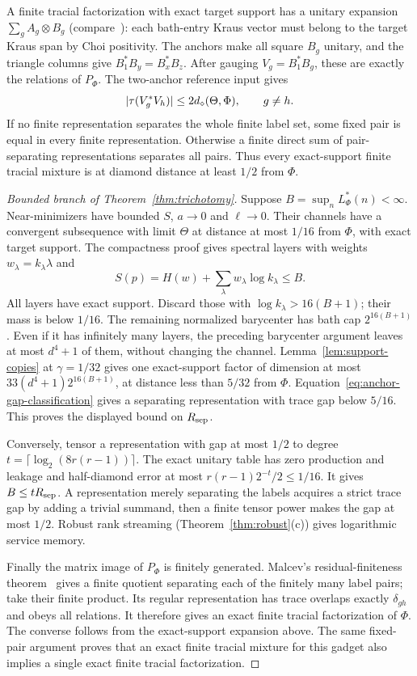 A finite tracial factorization with exact target support has a unitary expansion $\sum_gA_g\otimes B_g$
(compare~\cite[Theorem~2.2]{HaagerupMusat2011}):
each bath-entry Kraus vector must belong to the target Kraus span by Choi positivity.
The anchors make all square $B_g$ unitary, and the triangle columns give $B_1^*B_y=B_x^*B_z$.
After gauging $V_g=B_1^*B_g$, these are exactly the relations of $P_\Phi$.
The two-anchor reference input gives
\begin{equation}\label{eq:anchor-gap-classification}
 |\tau(V_g^*V_h)|\le2d_\diamond(\Theta,\Phi),\qquad g\ne h.
\end{equation}
If no finite representation separates the whole finite label set, some fixed pair is equal in every finite
representation. Otherwise a finite direct sum of pair-separating representations separates all pairs.
Thus every exact-support finite tracial mixture is at diamond distance at least $1/2$ from $\Phi$.

\begin{proof}[Bounded branch of Theorem~\ref{thm:trichotomy}]
Suppose $B=\sup_nL^*_\Phi(n)<\infty$. Near-minimizers have bounded $S$, $a\to0$ and $\ell\to0$.
Their channels have a convergent subsequence with limit $\Theta$ at distance at most $1/16$ from $\Phi$,
with exact target support. The compactness proof gives spectral layers with weights
$w_\lambda=k_\lambda\lambda$ and
\[
 S(p)=H(w)+\sum_\lambda w_\lambda\log k_\lambda\le B.
\]
All layers have exact support. Discard those with $\log k_\lambda>16(B+1)$; their mass is below $1/16$.
The remaining normalized barycenter has bath cap $2^{16(B+1)}$. Even if it has infinitely many layers,
the preceding barycenter argument leaves at most $d^4+1$ of them, without changing the channel.
Lemma~\ref{lem:support-copies} at $\gamma=1/32$ gives one exact-support factor of dimension
at most $33(d^4+1)2^{16(B+1)}$, at distance less than $5/32$ from $\Phi$.
Equation~\eqref{eq:anchor-gap-classification} gives a separating representation with trace gap below $5/16$.
This proves the displayed bound on $R_{\rm sep}$.

Conversely, tensor a representation with gap at most $1/2$ to degree
$t=\lceil\log_2(8r(r-1))\rceil$. The exact unitary table has zero production and leakage and
half-diamond error at most $r(r-1)2^{-t}/2\le1/16$.
It gives $B\le tR_{\rm sep}$. A representation merely separating the labels acquires a strict trace gap by
adding a trivial summand, then a finite tensor power makes the gap at most $1/2$.
Robust rank streaming (Theorem~\ref{thm:robust}(c)) gives logarithmic service memory.

Finally the matrix image of $P_\Phi$ is finitely generated. Malcev's residual-finiteness theorem~\cite{Nica2013}
gives a finite quotient separating each of the finitely many label pairs; take their finite product.
Its regular representation has trace overlaps exactly $\delta_{gh}$ and obeys all relations.
It therefore gives an exact finite tracial factorization of $\Phi$.
The converse follows from the exact-support expansion above. The same fixed-pair argument proves that an
exact finite tracial mixture for this gadget also implies a single exact finite tracial factorization.
\end{proof}

